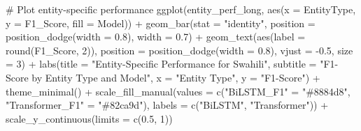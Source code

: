 \documentclass[
]{article}
\newenvironment{Shaded}{\begin{snugshade}}{\end{snugshade}}
\newcommand{\AttributeTok}[1]{\textcolor[rgb]{0.40,0.45,0.13}{#1}}
\newcommand{\CommentTok}[1]{\textcolor[rgb]{0.37,0.37,0.37}{#1}}
\newcommand{\DecValTok}[1]{\textcolor[rgb]{0.68,0.00,0.00}{#1}}
\newcommand{\FloatTok}[1]{\textcolor[rgb]{0.68,0.00,0.00}{#1}}
\newcommand{\FunctionTok}[1]{\textcolor[rgb]{0.28,0.35,0.67}{#1}}
\newcommand{\NormalTok}[1]{\textcolor[rgb]{0.00,0.23,0.31}{#1}}
\newcommand{\OtherTok}[1]{\textcolor[rgb]{0.00,0.23,0.31}{#1}}
\newcommand{\SpecialCharTok}[1]{\textcolor[rgb]{0.37,0.37,0.37}{#1}}
\newcommand{\StringTok}[1]{\textcolor[rgb]{0.13,0.47,0.30}{#1}}
\begin{document}
\begin{Shaded}
\begin{Highlighting}[]
\CommentTok{\# Plot entity{-}specific performance}
\FunctionTok{ggplot}\NormalTok{(entity\_perf\_long, }\FunctionTok{aes}\NormalTok{(}\AttributeTok{x =}\NormalTok{ EntityType, }\AttributeTok{y =}\NormalTok{ F1\_Score, }\AttributeTok{fill =}\NormalTok{ Model)) }\SpecialCharTok{+}
  \FunctionTok{geom\_bar}\NormalTok{(}\AttributeTok{stat =} \StringTok{"identity"}\NormalTok{, }\AttributeTok{position =} \FunctionTok{position\_dodge}\NormalTok{(}\AttributeTok{width =} \FloatTok{0.8}\NormalTok{), }\AttributeTok{width =} \FloatTok{0.7}\NormalTok{) }\SpecialCharTok{+}
  \FunctionTok{geom\_text}\NormalTok{(}\FunctionTok{aes}\NormalTok{(}\AttributeTok{label =} \FunctionTok{round}\NormalTok{(F1\_Score, }\DecValTok{2}\NormalTok{)), }
            \AttributeTok{position =} \FunctionTok{position\_dodge}\NormalTok{(}\AttributeTok{width =} \FloatTok{0.8}\NormalTok{), }
            \AttributeTok{vjust =} \SpecialCharTok{{-}}\FloatTok{0.5}\NormalTok{, }\AttributeTok{size =} \DecValTok{3}\NormalTok{) }\SpecialCharTok{+}
  \FunctionTok{labs}\NormalTok{(}\AttributeTok{title =} \StringTok{"Entity{-}Specific Performance for Swahili"}\NormalTok{,}
       \AttributeTok{subtitle =} \StringTok{"F1{-}Score by Entity Type and Model"}\NormalTok{,}
       \AttributeTok{x =} \StringTok{"Entity Type"}\NormalTok{,}
       \AttributeTok{y =} \StringTok{"F1{-}Score"}\NormalTok{) }\SpecialCharTok{+}
  \FunctionTok{theme\_minimal}\NormalTok{() }\SpecialCharTok{+}
  \FunctionTok{scale\_fill\_manual}\NormalTok{(}\AttributeTok{values =} \FunctionTok{c}\NormalTok{(}\StringTok{"BiLSTM\_F1"} \OtherTok{=} \StringTok{"\#8884d8"}\NormalTok{, }\StringTok{"Transformer\_F1"} \OtherTok{=} \StringTok{"\#82ca9d"}\NormalTok{),}
                   \AttributeTok{labels =} \FunctionTok{c}\NormalTok{(}\StringTok{"BiLSTM"}\NormalTok{, }\StringTok{"Transformer"}\NormalTok{)) }\SpecialCharTok{+}
  \FunctionTok{scale\_y\_continuous}\NormalTok{(}\AttributeTok{limits =} \FunctionTok{c}\NormalTok{(}\FloatTok{0.5}\NormalTok{, }\DecValTok{1}\NormalTok{))}
\end{Highlighting}
\end{Shaded}
\end{document}
